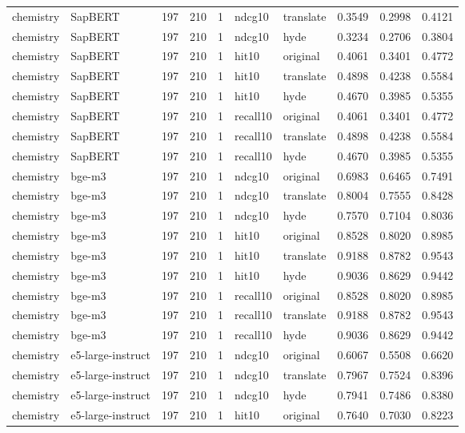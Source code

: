 \begin{tabular}{llrrrllrrr}
chemistry & SapBERT & 197 & 210 & 1 & ndcg10 & translate & 0.3549 & 0.2998 & 0.4121 \\
chemistry & SapBERT & 197 & 210 & 1 & ndcg10 & hyde & 0.3234 & 0.2706 & 0.3804 \\
chemistry & SapBERT & 197 & 210 & 1 & hit10 & original & 0.4061 & 0.3401 & 0.4772 \\
chemistry & SapBERT & 197 & 210 & 1 & hit10 & translate & 0.4898 & 0.4238 & 0.5584 \\
chemistry & SapBERT & 197 & 210 & 1 & hit10 & hyde & 0.4670 & 0.3985 & 0.5355 \\
chemistry & SapBERT & 197 & 210 & 1 & recall10 & original & 0.4061 & 0.3401 & 0.4772 \\
chemistry & SapBERT & 197 & 210 & 1 & recall10 & translate & 0.4898 & 0.4238 & 0.5584 \\
chemistry & SapBERT & 197 & 210 & 1 & recall10 & hyde & 0.4670 & 0.3985 & 0.5355 \\
chemistry & bge-m3 & 197 & 210 & 1 & ndcg10 & original & 0.6983 & 0.6465 & 0.7491 \\
chemistry & bge-m3 & 197 & 210 & 1 & ndcg10 & translate & 0.8004 & 0.7555 & 0.8428 \\
chemistry & bge-m3 & 197 & 210 & 1 & ndcg10 & hyde & 0.7570 & 0.7104 & 0.8036 \\
chemistry & bge-m3 & 197 & 210 & 1 & hit10 & original & 0.8528 & 0.8020 & 0.8985 \\
chemistry & bge-m3 & 197 & 210 & 1 & hit10 & translate & 0.9188 & 0.8782 & 0.9543 \\
chemistry & bge-m3 & 197 & 210 & 1 & hit10 & hyde & 0.9036 & 0.8629 & 0.9442 \\
chemistry & bge-m3 & 197 & 210 & 1 & recall10 & original & 0.8528 & 0.8020 & 0.8985 \\
chemistry & bge-m3 & 197 & 210 & 1 & recall10 & translate & 0.9188 & 0.8782 & 0.9543 \\
chemistry & bge-m3 & 197 & 210 & 1 & recall10 & hyde & 0.9036 & 0.8629 & 0.9442 \\
chemistry & e5-large-instruct & 197 & 210 & 1 & ndcg10 & original & 0.6067 & 0.5508 & 0.6620 \\
chemistry & e5-large-instruct & 197 & 210 & 1 & ndcg10 & translate & 0.7967 & 0.7524 & 0.8396 \\
chemistry & e5-large-instruct & 197 & 210 & 1 & ndcg10 & hyde & 0.7941 & 0.7486 & 0.8380 \\
chemistry & e5-large-instruct & 197 & 210 & 1 & hit10 & original & 0.7640 & 0.7030 & 0.8223 \\

\end{tabular}
